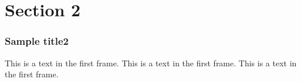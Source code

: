 \documentclass{beamer}
\begin{document}
\section{Section 2}
\begin{frame}
\frametitle{Sample title2}
This is a text in the first frame. This is a text in the first frame. This is a text in the first frame.
\end{frame}
\end{document}
